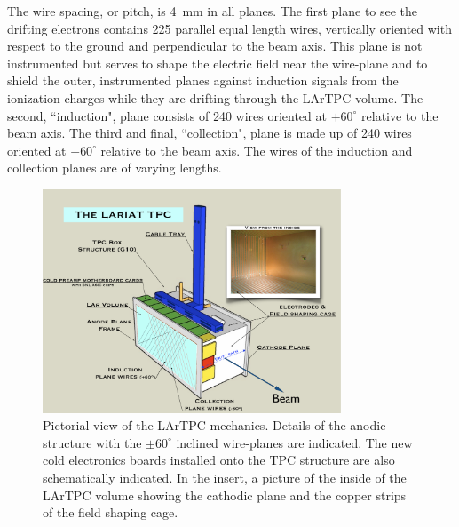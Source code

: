 \documentclass[DIV=calc, paper=a4, fontsize=10pt, twocolumn]{scrartcl}	 %
\begin{document}
{\begin{figure}[h!]
\end{figure}
The wire spacing, or pitch, is 4~mm in all planes. The first plane to see the drifting electrons contains 225 parallel equal length wires, vertically oriented with respect to the ground and perpendicular to the beam axis.  This plane is not instrumented but serves to shape the electric field near the wire-plane and to shield the outer, instrumented planes against induction signals from the ionization charges while they are drifting through the LArTPC volume. The second, ``induction", plane consists of 240 wires oriented at $\mathrm{+60^{\circ}}$ relative to the beam axis.   The third and final, ``collection", plane is made up of 240 wires oriented at $\mathrm{-60^{\circ}}$ relative to the beam axis. The wires of the induction and collection planes are of varying lengths. 
\begin{figure}[h!]
\begin{centering}
\includegraphics[width=3.5in]{Figures/TPC.pdf}
\caption{{\scriptsize \sf Pictorial view of the LArTPC mechanics. Details of the anodic structure with the $\pm 60^\circ$ inclined wire-planes are indicated. The new cold electronics boards installed onto the TPC structure are also schematically indicated. In the insert, a picture of the inside of the LArTPC volume showing the cathodic plane and the copper strips of the field shaping cage.}}
\label{fig:TPC_schematic}
\end{centering}
\end{figure}

}
\end{document}
